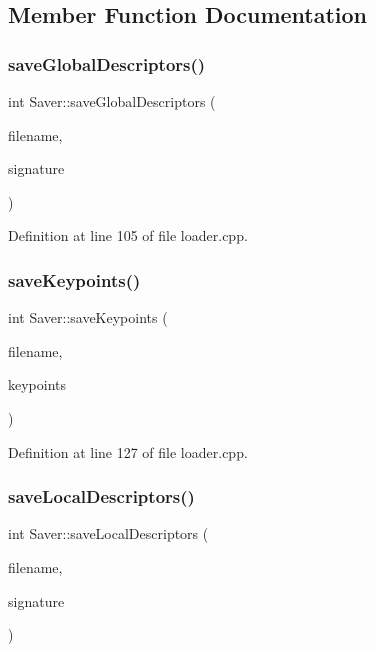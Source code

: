\subsection{Member Function Documentation}
\hypertarget{class_saver_a19a78a945fdc1da9193d46054a6ad80a}{}\label{class_saver_a19a78a945fdc1da9193d46054a6ad80a} 
\subsubsection{\texorpdfstring{save\+Global\+Descriptors()}{saveGlobalDescriptors()}}
{\footnotesize\ttfamily int Saver\+::save\+Global\+Descriptors (\begin{DoxyParamCaption}\item[{std\+::string}]{filename,  }\item[{pcl\+::\+Point\+Cloud$<$ pcl\+::\+V\+F\+H\+Signature308 $>$\+::Ptr \&}]{signature }\end{DoxyParamCaption})}



Definition at line 105 of file loader.\+cpp.

\hypertarget{class_saver_a11cd83568c660254febecb5cdbeca9e6}{}\label{class_saver_a11cd83568c660254febecb5cdbeca9e6} 
\subsubsection{\texorpdfstring{save\+Keypoints()}{saveKeypoints()}}
{\footnotesize\ttfamily int Saver\+::save\+Keypoints (\begin{DoxyParamCaption}\item[{std\+::string}]{filename,  }\item[{pcl\+::\+Point\+Cloud$<$ pcl\+::\+Point\+X\+Y\+Z\+R\+GB $>$\+::Ptr \&}]{keypoints }\end{DoxyParamCaption})}



Definition at line 127 of file loader.\+cpp.

\hypertarget{class_saver_a40c302f75d3721d2861a8e93685415ce}{}\label{class_saver_a40c302f75d3721d2861a8e93685415ce} 
\subsubsection{\texorpdfstring{save\+Local\+Descriptors()}{saveLocalDescriptors()}}
{\footnotesize\ttfamily int Saver\+::save\+Local\+Descriptors (\begin{DoxyParamCaption}\item[{std\+::string}]{filename,  }\item[{pcl\+::\+Point\+Cloud$<$ pcl\+::\+F\+P\+F\+H\+Signature33 $>$\+::Ptr \&}]{signature }\end{DoxyParamCaption})}



